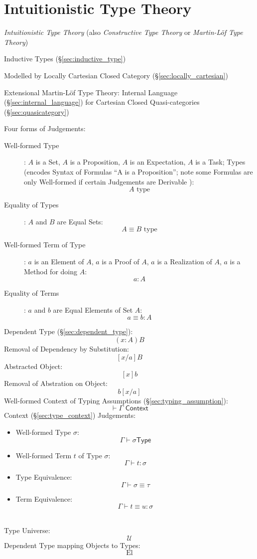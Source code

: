 \section{Intuitionistic Type Theory}\label{sec:intuitionistic_type}
\cite{martinlof84}

\emph{Intuitionistic Type Theory} (also \emph{Constructive Type
  Theory} or \emph{Martin-L\"of Type Theory})

Inductive Types (\S\ref{sec:inductive_type})

Modelled by Locally Cartesian Closed Category
(\S\ref{sec:locally_cartesian})

Extensional Martin-L\"of Type Theory: Internal Language
(\S\ref{sec:internal_language}) for Cartesian Closed Quasi-categories
(\S\ref{sec:quasicategory})

Four forms of Judgements:
\begin{description}
  \item [Well-formed Type]: $A$ is a Set, $A$ is a Proposition, $A$ is
    an Expectation, $A$ is a Task; Types (encodes Syntax of Formulas
    ``A is a Proposition''; note some Formulas are only Well-formed if
    certain Judgements are Derivable \cite{thompson99}):
    \[
      A \text{ type}
    \]
  \item [Equality of Types]: $A$ and $B$ are Equal Sets:
    \[
      A \equiv B \text{ type}
    \]
  \item [Well-formed Term of Type]: $a$ is an Element of $A$, $a$ is a
    Proof of $A$, $a$ is a Realization of $A$, $a$ is a Method for
    doing $A$:
    \[
      a : A
    \]
  \item [Equality of Terms]: $a$ and $b$ are Equal Elements of Set $A$:
    \[
      a \equiv b : A
    \]
\end{description}

Dependent Type (\S\ref{sec:dependent_type}):
\[
  (x:A)B
\]
Removal of Dependency by Substitution:
\[
  [x/a]B
\]
Abstracted Object:
\[
  [x]b
\]
Removal of Abstration on Object:
\[
  b[x/a]
\]
Well-formed Context of Typing Assumptions
(\S\ref{sec:typing_assumption}):
\[
  \vdash \Gamma \textsf{ Context}
\]
Context (\S\ref{sec:type_context}) Judgements:
\begin {itemize}
\item Well-formed Type $\sigma$:
  \[
    \Gamma \vdash \sigma \mathsf{ Type}
  \]
\item Well-formed Term $t$ of Type $\sigma$:
  \[
    \Gamma \vdash t : \sigma
  \]
\item Type Equivalence:
  \[
    \Gamma \vdash \sigma \equiv \tau
  \]
\item Term Equivalence:
  \[
    \Gamma \vdash t \equiv u : \sigma
  \]
\end {itemize}
\hfill\\
Type Universe:
\[
  \mathcal{U}
\]
Dependent Type mapping Objects to Types:
\[
  \textrm{El}
\]

